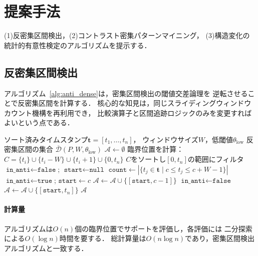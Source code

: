 \section{提案手法}\label{sec:method}

(1)反密集区間検出，(2)コントラスト密集パターンマイニング，
(3)構造変化の統計的有意性検定のアルゴリズムを提示する．

\subsection{反密集区間検出}\label{sec:anti_dense_algo}

アルゴリズム~\ref{alg:anti_dense}は，密集区間検出の閾値交差論理を
逆転させることで反密集区間を計算する．
核心的な知見は，同じスライディングウィンドウカウント機構を再利用でき，
比較演算子と区間追跡ロジックのみを変更すればよいという点である．

\begin{algorithm}[t]
\caption{反密集区間検出}
\label{alg:anti_dense}
\begin{algorithmic}[1]
\REQUIRE ソート済みタイムスタンプ$\mathbf{t} = [t_1, \ldots, t_n]$，
  ウィンドウサイズ$W$，低閾値$\theta_{\text{low}}$
\ENSURE 反密集区間の集合
  $\overline{\mathcal{D}}(P, W, \theta_{\text{low}})$
\STATE $\mathcal{A} \leftarrow \emptyset$ 
\STATE 臨界位置を計算：
  $C = \{t_i\} \cup \{t_i - W\} \cup \{t_i + 1\} \cup \{0, t_n\}$
\STATE $C$をソートし$[0, t_n]$の範囲にフィルタ
\STATE $\texttt{in\_anti} \leftarrow \texttt{false}$;
  $\texttt{start} \leftarrow \texttt{null}$
  \STATE $\texttt{count} \leftarrow |\{t_j \in \mathbf{t} \mid
    c \leq t_j \leq c + W - 1\}|$ 
      \STATE $\texttt{in\_anti} \leftarrow \texttt{true}$;
        $\texttt{start} \leftarrow c$
    \ENDIF
  \ELSE
      \STATE $\mathcal{A} \leftarrow \mathcal{A} \cup
        \{[\texttt{start}, c-1]\}$
      \STATE $\texttt{in\_anti} \leftarrow \texttt{false}$
    \ENDIF
  \ENDIF
\ENDFOR
{}
  \STATE $\mathcal{A} \leftarrow \mathcal{A} \cup
    \{[\texttt{start}, t_n]\}$
\ENDIF
\RETURN $\mathcal{A}$
\end{algorithmic}
\end{algorithm}

\paragraph{計算量}
アルゴリズムは$O(n)$個の臨界位置でサポートを評価し，各評価には
二分探索による$O(\log n)$時間を要する．
総計算量は$O(n \log n)$であり，密集区間検出アルゴリズムと一致する．

